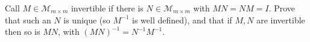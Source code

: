 \begin{exercise}
  \label{ex:hw02:inverse-uniqueness-and-products}
  Call \(M\in\mathcal M_{m\times m}\) invertible if there is
  \(N\in\mathcal M_{m\times m}\) with \(MN=NM=I\). Prove that
  such an \(N\) is unique (so \(M^{-1}\) is well defined), and that
  if \(M,N\) are invertible then so is \(MN\), with
  \((MN)^{-1}=N^{-1}M^{-1}\).
\end{exercise}
